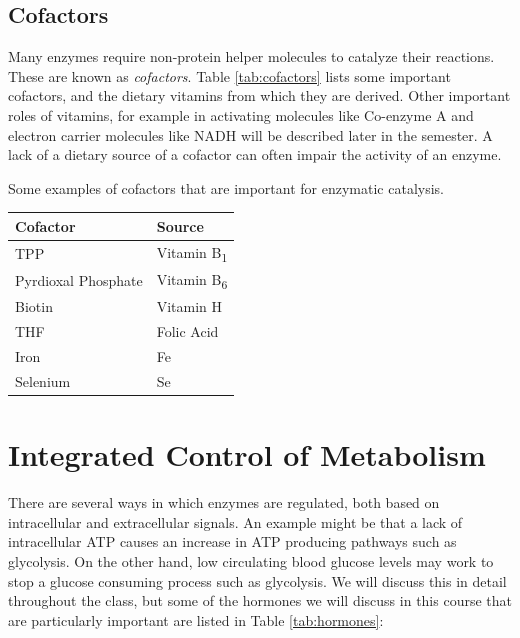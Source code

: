 \documentclass{tufte-handout}
\begin{document}
\subsection{Cofactors}
Many enzymes require non-protein helper molecules to catalyze their reactions.  These are known as \emph{cofactors}.  Table \ref{tab:cofactors} lists some important cofactors, and the dietary vitamins from which they are derived.  Other important roles of vitamins, for example in activating molecules like Co-enzyme A and electron carrier molecules like NADH will be described later in the semester.  A lack of a dietary source of a cofactor can often impair the activity of an enzyme.

\begin{margintable}
\caption{Some examples of cofactors that are important for enzymatic catalysis.}
\label{tab:cofactors}
\begin{tabular}{@{}ll@{}}
 \textbf{Cofactor}  & \textbf{Source}           \\ \midrule
TPP & Vitamin B\textsubscript{1} \\
Pyrdioxal Phosphate & Vitamin B\textsubscript{6} \\
Biotin & Vitamin H \\
THF & Folic Acid \\
Iron &  Fe \\ 
Selenium & Se \\ \bottomrule
\end{tabular}
\end{margintable}

\section{Integrated Control of Metabolism}

There are several ways in which enzymes are regulated, both based on intracellular and extracellular signals.  An example might be that a lack of intracellular ATP causes an increase in ATP producing pathways such as glycolysis.  On the other hand, low circulating blood glucose levels may work to stop a glucose consuming process such as glycolysis.  We will discuss this in detail throughout the class, but some of the hormones we will discuss in this course that are particularly important are listed in Table \ref{tab:hormones}:
\end{document}
